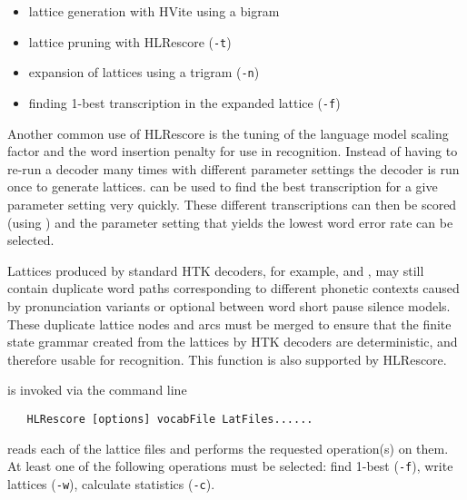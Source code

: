 \begin{itemize}
\item lattice generation with HVite using a bigram
\item lattice pruning with HLRescore (\texttt{-t})
\item expansion of lattices using a trigram (\texttt{-n})
\item finding 1-best transcription in the expanded lattice
  (\texttt{-f})
\end{itemize}

Another common use of HLRescore is the tuning of the language
model scaling factor and the word insertion penalty for use in
recognition. Instead of having to re-run a decoder many times with
different parameter settings the decoder is run once to generate
lattices.  can be used to find the best transcription
for a give parameter setting very quickly. These different
transcriptions can then be scored (using ) and the
parameter setting that yields the lowest word error rate can be
selected. 

Lattices produced by standard HTK decoders, for example,
 and , may still contain duplicate word
paths corresponding to different phonetic contexts caused by
pronunciation variants or optional between word short pause silence
models. These duplicate lattice nodes and arcs must be merged to
ensure that the finite state grammar created from the lattices by HTK
decoders are deterministic, and therefore usable for recognition. 
This function is also supported by HLRescore.



 is invoked via the command line
\begin{verbatim}
   HLRescore [options] vocabFile LatFiles......
\end{verbatim}

 reads each of the lattice files and performs the
requested operation(s) on them. At least one of the following
operations must be selected: find 1-best (\texttt{-f}), write lattices
(\texttt{-w}), calculate statistics (\texttt{-c}).


